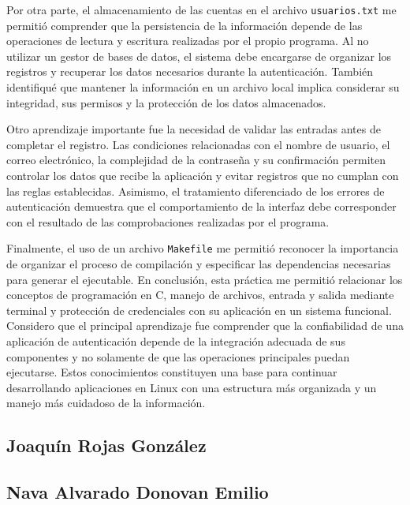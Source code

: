Por otra parte, el almacenamiento de las cuentas en el archivo \texttt{usuarios.txt} me permitió comprender que la persistencia de la información depende de las operaciones de lectura y escritura realizadas por el propio programa.
Al no utilizar un gestor de bases de datos, el sistema debe encargarse de organizar los registros y recuperar los datos necesarios durante la autenticación.
También identifiqué que mantener la información en un archivo local implica considerar su integridad, sus permisos y la protección de los datos almacenados.

Otro aprendizaje importante fue la necesidad de validar las entradas antes de completar el registro.
Las condiciones relacionadas con el nombre de usuario, el correo electrónico, la complejidad de la contraseña y su confirmación permiten controlar los datos que recibe la aplicación y evitar registros que no cumplan con las reglas establecidas.
Asimismo, el tratamiento diferenciado de los errores de autenticación demuestra que el comportamiento de la interfaz debe corresponder con el resultado de las comprobaciones realizadas por el programa.

Finalmente, el uso de un archivo \texttt{Makefile} me permitió reconocer la importancia de organizar el proceso de compilación y especificar las dependencias necesarias para generar el ejecutable.
En conclusión, esta práctica me permitió relacionar los conceptos de programación en C, manejo de archivos, entrada y salida mediante terminal y protección de credenciales con su aplicación en un sistema funcional.
Considero que el principal aprendizaje fue comprender que la confiabilidad de una aplicación de autenticación depende de la integración adecuada de sus componentes y no solamente de que las operaciones principales puedan ejecutarse.
Estos conocimientos constituyen una base para continuar desarrollando aplicaciones en Linux con una estructura más organizada y un manejo más cuidadoso de la información.

\newpage

\subsection{Joaquín Rojas González}

\newpage

\subsection{Nava Alvarado Donovan Emilio}
